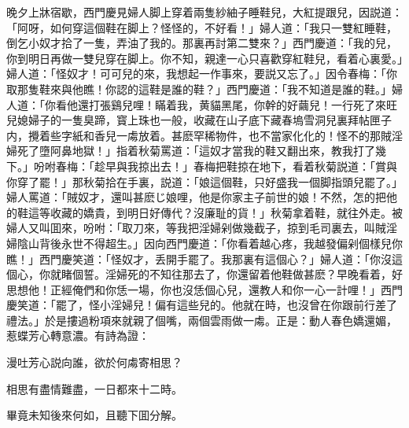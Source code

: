 晚夕上牀宿歇，西門慶見婦人脚上穿着兩隻紗紬子睡鞋兒，大紅提跟兒，因説道：「阿呀，如何穿這個鞋在脚上？怪怪的，不好看！」婦人道：「我只一雙紅睡鞋，倒乞小奴才拾了一隻，弄油了我的。那裏再討第二雙來？」西門慶道：「我的兒，你到明日再做一雙兒穿在脚上。你不知，親達一心只喜歡穿紅鞋兒，看着心裏愛。」婦人道：「怪奴才！可可兒的來，我想起一作事來，要説又忘了。」因令春梅：「你取那隻鞋來與他瞧！你認的這鞋是誰的鞋？」西門慶道：「我不知道是誰的鞋。」婦人道：「你看他還打張鷄兒哩！瞞着我，黄貓黑尾，你幹的好繭兒！一行死了來旺兒媳婦子的一隻臭蹄，寳上珠也一般，收藏在山子底下藏春塢雪洞兒裏拜帖匣子内，攪着些字紙和香兒一䖏放着。甚麽罕稀物件，也不當家化化的！怪不的那賊淫婦死了墮阿鼻地獄！」指着秋菊罵道：「這奴才當我的鞋又翻出來，教我打了幾下。」吩咐春梅：「趁早與我掠出去！」春梅把鞋掠在地下，看着秋菊説道：「賞與你穿了罷！」那秋菊拾在手裏，説道：「娘這個鞋，只好盛我一個脚指頭兒罷了。」婦人罵道：「賊奴才，還叫甚麽じ娘哩，他是你家主子前世的娘！不然，怎的把他的鞋這等收藏的嬌貴，到明日好傳代？沒廉耻的貨！」秋菊拿着鞋，就往外走。被婦人又叫囬來，吩咐：「取刀來，等我把淫婦剁做幾截子，掠到毛司裏去，叫賊淫婦陰山背後永世不得超生。」因向西門慶道：「你看着越心疼，我越發偏剁個樣兒你瞧！」西門慶笑道：「怪奴才，丢開手罷了。我那裏有這個心？」婦人道：「你沒這個心，你就睹個誓。淫婦死的不知往那去了，你還留着他鞋做甚麽？早晚看着，好思想他！正經俺們和你恁一場，你也沒恁個心兒，還教人和你一心一計哩！」西門慶笑道：「罷了，怪小淫婦兒！偏有這些兒的。他就在時，也沒曾在你跟前行差了禮法。」於是摟過粉項來就親了個嘴，兩個雲雨做一䖏。正是：動人春色嬌還媚，惹蝶芳心轉意濃。有詩為證：

漫吐芳心説向誰，欲於何䖏寄相思？

相思有盡情難盡，一日都來十二時。

畢竟未知後來何如，且聽下囬分解。


